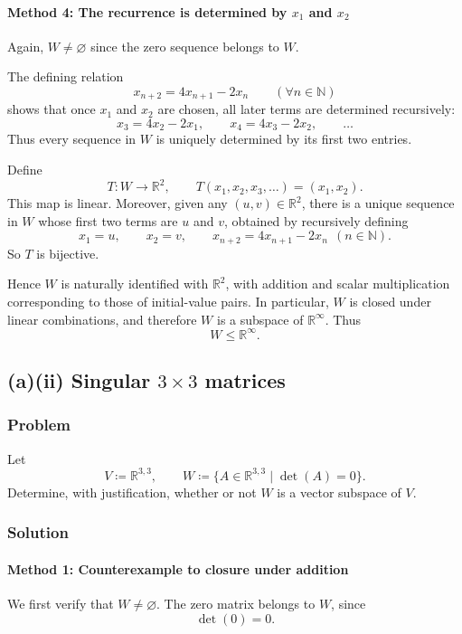 \documentclass[12pt]{article}
\newcommand{\R}{\mathbb{R}}
\newcommand{\N}{\mathbb{N}}
\begin{document}
\paragraph{Method 4: The recurrence is determined by \(x_1\) and \(x_2\)}
Again, \(W\neq\varnothing\) since the zero sequence belongs to \(W\).

The defining relation
\[
x_{n+2}=4x_{n+1}-2x_n \qquad (\forall n\in\N)
\]
shows that once \(x_1\) and \(x_2\) are chosen, all later terms are determined recursively:
\[
x_3=4x_2-2x_1,\qquad
x_4=4x_3-2x_2,\qquad \ldots
\]
Thus every sequence in \(W\) is uniquely determined by its first two entries.

Define
\[
T:W\to \R^2,\qquad
T(x_1,x_2,x_3,\ldots)=(x_1,x_2).
\]
This map is linear. Moreover, given any \((u,v)\in\R^2\), there is a unique sequence in \(W\) whose first two terms are \(u\) and \(v\), obtained by recursively defining
\[
x_1=u,\qquad x_2=v,\qquad x_{n+2}=4x_{n+1}-2x_n \ \ (n\in\N).
\]
So \(T\) is bijective.

Hence \(W\) is naturally identified with \(\R^2\), with addition and scalar multiplication corresponding to those of initial-value pairs. In particular, \(W\) is closed under linear combinations, and therefore \(W\) is a subspace of \(\R^\infty\). Thus
\[
\boxed{W\le \R^\infty.}
\]

\bigskip

\newpage
\subsection{(a)(ii) Singular \(3\times 3\) matrices}
\subsubsection{Problem}
Let
\[
V \coloneqq \R^{3,3},\qquad
W \coloneqq \{A\in \R^{3,3}\mid \det(A)=0\}.
\]
Determine, with justification, whether or not \(W\) is a vector subspace of \(V\).

\subsubsection{Solution}

\paragraph{Method 1: Counterexample to closure under addition}
We first verify that \(W\neq\varnothing\). The zero matrix belongs to \(W\), since
\[
\det(0)=0.
\]
\end{document}
